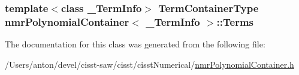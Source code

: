 \subsubsection[{Terms}]{\setlength{\rightskip}{0pt plus 5cm}template$<$class \+\_\+\+Term\+Info$>$ {\bf Term\+Container\+Type} {\bf nmr\+Polynomial\+Container}$<$ \+\_\+\+Term\+Info $>$\+::Terms\hspace{0.3cm}{\ttfamily [protected]}}\label{classnmr_polynomial_container_a70c5e0c98f3a13222bb51bf855e6988a}


The documentation for this class was generated from the following file\+:\begin{DoxyCompactItemize}
\item 
/\+Users/anton/devel/cisst-\/saw/cisst/cisst\+Numerical/\hyperlink{nmr_polynomial_container_8h}{nmr\+Polynomial\+Container.\+h}\end{DoxyCompactItemize}
